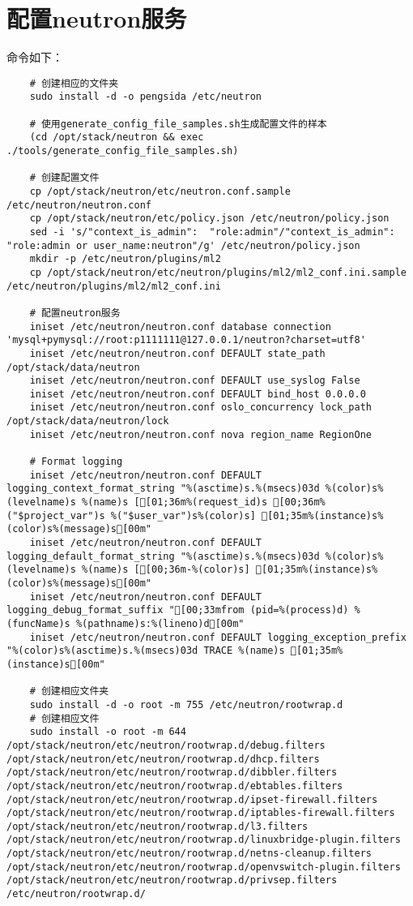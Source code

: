 \documentclass[a4paper,left=1.5cm,right=1.5cm,11pt]{article}
\begin{document}
\section{配置neutron服务}
	命令如下：
	\begin{lstlisting}
	# 创建相应的文件夹
	sudo install -d -o pengsida /etc/neutron

	# 使用generate_config_file_samples.sh生成配置文件的样本
	(cd /opt/stack/neutron && exec ./tools/generate_config_file_samples.sh)

	# 创建配置文件
	cp /opt/stack/neutron/etc/neutron.conf.sample /etc/neutron/neutron.conf
	cp /opt/stack/neutron/etc/policy.json /etc/neutron/policy.json
	sed -i 's/"context_is_admin":  "role:admin"/"context_is_admin":  "role:admin or user_name:neutron"/g' /etc/neutron/policy.json
	mkdir -p /etc/neutron/plugins/ml2
	cp /opt/stack/neutron/etc/neutron/plugins/ml2/ml2_conf.ini.sample /etc/neutron/plugins/ml2/ml2_conf.ini
	
	# 配置neutron服务
	iniset /etc/neutron/neutron.conf database connection 'mysql+pymysql://root:p1111111@127.0.0.1/neutron?charset=utf8'
	iniset /etc/neutron/neutron.conf DEFAULT state_path /opt/stack/data/neutron
	iniset /etc/neutron/neutron.conf DEFAULT use_syslog False
	iniset /etc/neutron/neutron.conf DEFAULT bind_host 0.0.0.0
	iniset /etc/neutron/neutron.conf oslo_concurrency lock_path /opt/stack/data/neutron/lock
	iniset /etc/neutron/neutron.conf nova region_name RegionOne

	# Format logging
	iniset /etc/neutron/neutron.conf DEFAULT logging_context_format_string "%(asctime)s.%(msecs)03d %(color)s%(levelname)s %(name)s [[01;36m%(request_id)s [00;36m%("$project_var")s %("$user_var")s%(color)s] [01;35m%(instance)s%(color)s%(message)s[00m"
	iniset /etc/neutron/neutron.conf DEFAULT logging_default_format_string "%(asctime)s.%(msecs)03d %(color)s%(levelname)s %(name)s [[00;36m-%(color)s] [01;35m%(instance)s%(color)s%(message)s[00m"
	iniset /etc/neutron/neutron.conf DEFAULT logging_debug_format_suffix "[00;33mfrom (pid=%(process)d) %(funcName)s %(pathname)s:%(lineno)d[00m"
	iniset /etc/neutron/neutron.conf DEFAULT logging_exception_prefix "%(color)s%(asctime)s.%(msecs)03d TRACE %(name)s [01;35m%(instance)s[00m"

	# 创建相应文件夹
	sudo install -d -o root -m 755 /etc/neutron/rootwrap.d
	# 创建相应文件
	sudo install -o root -m 644 /opt/stack/neutron/etc/neutron/rootwrap.d/debug.filters /opt/stack/neutron/etc/neutron/rootwrap.d/dhcp.filters /opt/stack/neutron/etc/neutron/rootwrap.d/dibbler.filters /opt/stack/neutron/etc/neutron/rootwrap.d/ebtables.filters /opt/stack/neutron/etc/neutron/rootwrap.d/ipset-firewall.filters /opt/stack/neutron/etc/neutron/rootwrap.d/iptables-firewall.filters /opt/stack/neutron/etc/neutron/rootwrap.d/l3.filters /opt/stack/neutron/etc/neutron/rootwrap.d/linuxbridge-plugin.filters /opt/stack/neutron/etc/neutron/rootwrap.d/netns-cleanup.filters /opt/stack/neutron/etc/neutron/rootwrap.d/openvswitch-plugin.filters /opt/stack/neutron/etc/neutron/rootwrap.d/privsep.filters /etc/neutron/rootwrap.d/
	

\end{lstlisting}
\end{document}

